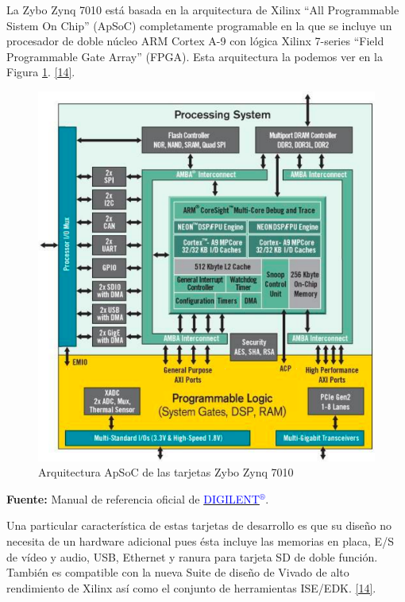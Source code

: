 \newpage
La Zybo Zynq 7010 está basada en la arquitectura de Xilinx ``All Programmable Sistem On Chip'' (ApSoC) completamente programable en la que se incluye un procesador de doble núcleo ARM Cortex A-9 con lógica Xilinx 7-series ``Field Programmable Gate Array'' (FPGA). Esta arquitectura la podemos ver en la Figura \ref{Arquitectura ApSoC de las tarjetas Zybo Zynq 7010}. \hyperlink{14}{[14]}.

\begin{figure}[h]
	\centering
	\includegraphics[scale=0.65]{Metodologia/MarcoTeorico/ApSoC.png}
	\caption{Arquitectura ApSoC de las tarjetas Zybo Zynq 7010}
	\label{Arquitectura ApSoC de las tarjetas Zybo Zynq 7010}
\end{figure}
\begin{center}
	\textbf{Fuente:} Manual de referencia oficial de \href{https://reference.digilentinc.com/_media/zybo:zybo_rm.pdf}{\textcolor{blue}{DIGILENT$^{\circledR}$}}.
\end{center}

Una particular característica de estas tarjetas de desarrollo es que su diseño no necesita de un hardware adicional pues ésta incluye las memorias en placa, E/S de vídeo y audio, USB, Ethernet y ranura para tarjeta SD de doble función. También es compatible con la nueva Suite de diseño de Vivado de alto rendimiento de Xilinx así como el conjunto de herramientas ISE/EDK. \hyperlink{14}{[14]}.

